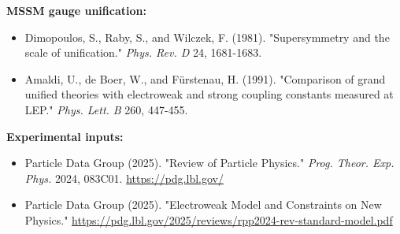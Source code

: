 \textbf{MSSM gauge unification:}

\begin{itemize}
\tightlist
\item
  Dimopoulos, S., Raby, S., and Wilczek, F. (1981). "Supersymmetry and the scale of unification." \emph{Phys. Rev. D} 24, 1681-1683.
\item
  Amaldi, U., de Boer, W., and F\"{u}rstenau, H. (1991). "Comparison of grand unified theories with electroweak and strong coupling constants measured at LEP." \emph{Phys. Lett. B} 260, 447-455.
\end{itemize}

\textbf{Experimental inputs:}

\begin{itemize}
\tightlist
\item
  Particle Data Group (2025). "Review of Particle Physics." \emph{Prog. Theor. Exp. Phys.} 2024, 083C01. \url{https://pdg.lbl.gov/}
\item
  Particle Data Group (2025). "Electroweak Model and Constraints on New Physics." \url{https://pdg.lbl.gov/2025/reviews/rpp2024-rev-standard-model.pdf}
\end{itemize}

